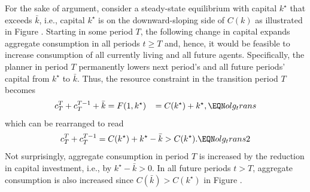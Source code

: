 For the sake of argument, consider a steady-state 
equilibrium with capital $k^\star$ that exceeds $\bar k$, 
i.e., capital $k^\star$ is on the downward-sloping 
side of $C(k)$ as illustrated in Figure .
Starting in some period $T$, the following change in
capital expands aggregate consumption in 
all periods $t\geq T$ and, hence, it would be feasible 
to increase consumption of all currently living and all 
future agents. Specifically, the planner in period $T$
permanently lowers next period's and all future 
periods' capital from $k^\star$ to $\bar k$. Thus,
the resource constraint in the transition period $T$
becomes
$$ c^T_T + c^{T-1}_T + \bar k = F(1,k^\star)
\;\;\;=C(k^\star) + k^\star,      \EQN olg_trans $$
which can be rearranged to read
$$ c^T_T + c^{T-1}_T
   =C(k^\star) + k^\star - \bar k > C(k^\star). \EQN olg_trans2 $$
Not surprisingly, aggregate consumption in period $T$ 
is increased by the reduction in capital investment,
i.e., by $k^\star - \bar k>0$. In all future periods $t>T$, 
aggregate consumption is also increased since 
$C(\bar k) > C(k^\star)$ in Figure .




